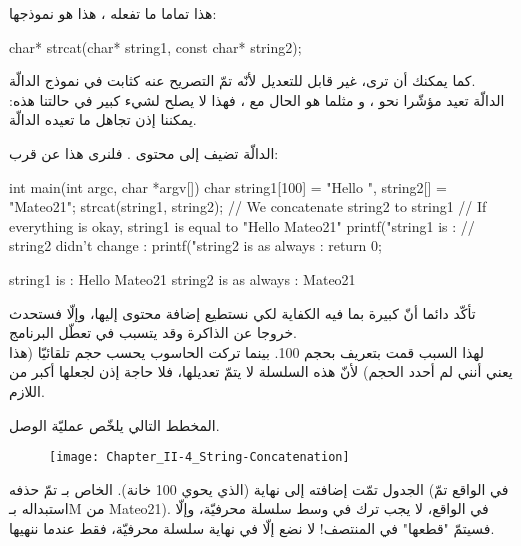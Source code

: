 هذا تماما ما تفعله
، هذا هو نموذجها:

\begin{Csource}
char* strcat(char* string1, const char* string2);
\end{Csource}

كما يمكنك أن ترى،
غير قابل للتعديل لأنّه تمّ التصريح عنه كثابت في نموذج الدالّة.\\
الدالّة تعيد مؤشّرا نحو
،
و مثلما هو الحال مع
،
فهذا لا يصلح لشيء كبير في حالتنا هذه: يمكننا إذن تجاهل ما تعيده الدالّة.

الدالّة تضيف إلى
محتوى
.
فلنرى هذا عن قرب:

\begin{Csource}
int main(int argc, char *argv[])
{
	char string1[100] = "Hello ", string2[] = "Mateo21";
	strcat(string1, string2); // We concatenate string2 to string1
	// If everything is okay, string1 is equal to "Hello Mateo21"
	 printf("string1 is : %
	// string2 didn't change :
	printf("string2 is as always : %
	return 0;
}
\end{Csource}

\begin{Console}
string1 is : Hello Mateo21
string2 is as always : Mateo21
\end{Console}

تأكّد دائما أنّ
كبيرة بما فيه الكفاية لكي نستطيع إضافة محتوى
إليها، وإلّا فستحدث خروجا عن الذاكرة وقد يتسبب في تعطّل البرنامج.\\
لهذا السبب قمت بتعريف
بحجم 100. بينما تركت الحاسوب يحسب حجم
تلقائيّا (هذا يعني أنني لم أحدد الحجم) لأنّ هذه السلسلة لا يتمّ تعديلها، فلا حاجة إذن لجعلها أكبر من اللازم.

المخطط التالي يلخّص عمليّة الوصل.

\begin{figure}[H]
	\centering
	\texttt{[image: Chapter\_II-4\_String-Concatenation]}
\end{figure}

الجدول
تمّت إضافته إلى نهاية
(الذي يحوي 100 خانة).
الخاص بـ
تمّ حذفه (في الواقع تمّ استبداله بـ\textenglish{M} من \textenglish{Mateo21}). في الواقع، لا يجب ترك
في وسط سلسلة محرفيّة، وإلّا فسيتمّ "قطعها" في المنتصف! لا نضع
إلّا في نهاية سلسلة محرفيّة، فقط عندما ننهيها.


